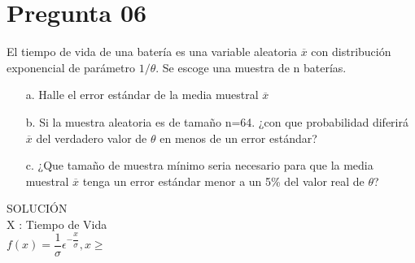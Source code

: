 \documentclass[10pt,a4paper]{article}
\begin{document}
\section{Pregunta 06}
El tiempo de vida de una batería es una variable aleatoria $\overline{x}$ con distribución exponencial de parámetro $1/\theta$. Se escoge una muestra de n baterías.
\begin{itemize}
\item[a.] Halle el error estándar de la media muestral $\overline{x}$
\item[b.] Si la muestra aleatoria es de tamaño n=64. ¿con que probabilidad diferirá $\overline{x}$ del verdadero valor de $\theta$ en menos de un error estándar?
\item[c.] ¿Que tamaño de muestra mínimo seria necesario para que la media muestral $\overline{x}$ tenga un error estándar menor a un 5\% del valor real de $\theta$?
\end{itemize} 
SOLUCIÓN\\
X : Tiempo de Vida\\
$f(x) = \dfrac{1}{\sigma}\epsilon^{-\dfrac{x}{\sigma}} , x \geq$\\
\end{document}
